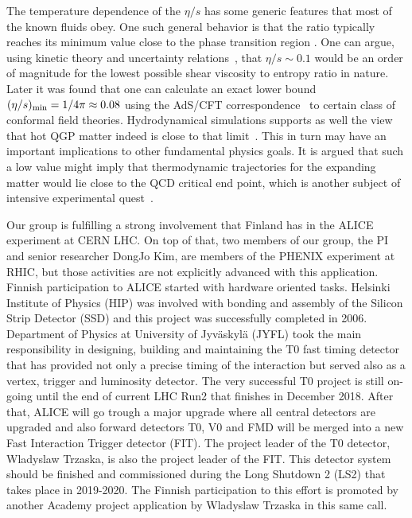 The temperature dependence of the $\eta/s$ has some generic features that most of the known fluids obey. One such general behavior is that the ratio typically reaches its minimum value close to the phase transition region \cite{PhysRevLett.98.092301}. One can argue, using kinetic theory and uncertainty relations~\cite{PhysRevD.31.53}, that $\eta/s\sim0.1$ would be an order of magnitude for the lowest possible shear viscosity to entropy ratio in nature. Later it was found that one can calculate an exact lower bound $(\eta/s)_{\rm min}=1/4\pi\approx0.08$ using the AdS/CFT correspondence~\cite{PhysRevLett.94.111601} to certain class of conformal field theories. Hydrodynamical simulations supports as well the view that hot QGP matter indeed is close to that limit~\cite{Gale:2012rq}. This in turn may have an important implications to other fundamental physics goals. It is argued that such a low value might imply that thermodynamic trajectories for the expanding matter would lie close to the QCD critical end point, which is another subject of intensive experimental quest~\cite{PhysRevLett.98.092301}.

Our group is fulfilling a strong involvement that Finland has in the ALICE experiment at CERN LHC. On top of that, two members of our group, the PI and senior researcher DongJo Kim, are members of the PHENIX experiment at RHIC, but those activities are not explicitly advanced with this application. Finnish participation to ALICE started with hardware oriented tasks. Helsinki Institute of Physics (HIP) was involved with bonding and assembly of the Silicon Strip Detector (SSD) and this project was successfully completed in 2006. Department of Physics at University of Jyv\"askyl\"a (JYFL) took the main responsibility in designing, building and maintaining the T0 fast timing detector that has provided not only a precise timing of the interaction but served also as a vertex, trigger and luminosity detector. The very successful T0 project is still on-going until the end of current LHC Run2 that finishes in December 2018. After that, ALICE will go trough a major upgrade where all central detectors are upgraded and also forward detectors T0, V0 and FMD will be merged into a new Fast Interaction Trigger detector  (FIT). The project leader of the T0 detector, Wladyslaw Trzaska, is also the project leader of the FIT. 
This detector system should be finished and commissioned during the Long Shutdown 2 (LS2) that takes place in 2019-2020. 
The Finnish participation to this effort is promoted by another Academy project application by Wladyslaw Trzaska in this same call.

